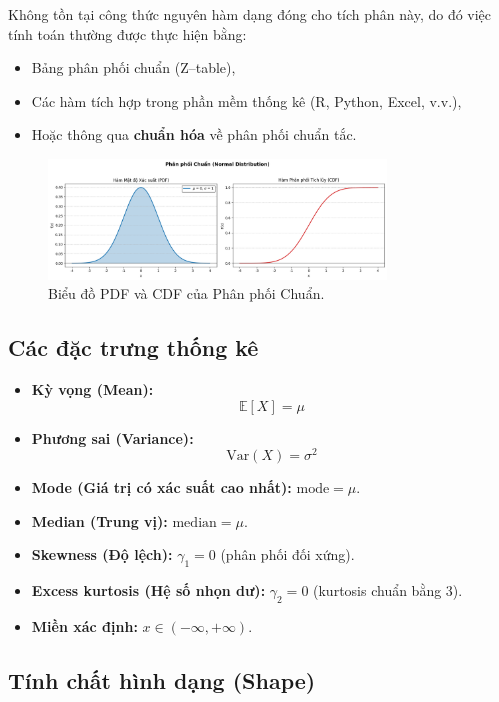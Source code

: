 Không tồn tại công thức nguyên hàm dạng đóng cho tích phân này, do đó việc tính toán thường được thực hiện bằng:
\begin{itemize}
    \item Bảng phân phối chuẩn (Z–table),
    \item Các hàm tích hợp trong phần mềm thống kê (R, Python, Excel, v.v.),
    \item Hoặc thông qua \textbf{chuẩn hóa} về phân phối chuẩn tắc.
\end{itemize}

\begin{figure}[h!]
    \centering
    \includegraphics[width=0.8\textwidth]{images/Normal_PDF_and_CDF.png}
    \caption{Biểu đồ PDF và CDF của Phân phối Chuẩn.}
    \label{fig:normal_dist}
\end{figure}

\subsection{Các đặc trưng thống kê}

\begin{itemize}
    \item \textbf{Kỳ vọng (Mean):} 
    \[
    \mathbb{E}[X] = \mu
    \]
    \item \textbf{Phương sai (Variance):} 
    \[
    \mathrm{Var}(X) = \sigma^2
    \]
    \item \textbf{Mode (Giá trị có xác suất cao nhất):} $\mathrm{mode} = \mu$.
    \item \textbf{Median (Trung vị):} $\mathrm{median} = \mu$.
    \item \textbf{Skewness (Độ lệch):} $\gamma_1 = 0$ (phân phối đối xứng).
    \item \textbf{Excess kurtosis (Hệ số nhọn dư):} $\gamma_2 = 0$ (kurtosis chuẩn bằng 3).
    \item \textbf{Miền xác định:} $x \in (-\infty, +\infty)$.
\end{itemize}

\subsection{Tính chất hình dạng (Shape)}

